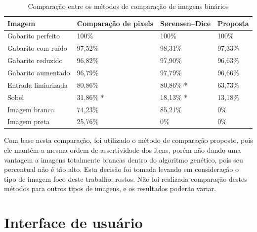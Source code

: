 \documentclass[12pt,oneside,a4paper,english,french,spanish,brazil,]{abntex2}
\begin{document}
\begin{table}
\centering
\caption{Comparação entre os métodos de comparação de imagens binários}
\label{tab:ComparacaoImagens}
\begin{tabular}{llll}
\hline
\textbf{Imagem} & \textbf{Comparação de pixels} & \textbf{Sørensen–Dice} & \textbf{Proposta} \\ \hline
Gabarito perfeito        & 100\%                                  & 100\%                           & 100\%                             \\
Gabarito com ruído       & 97,52\%                                & 98,31\%                         & 97,33\%                           \\
Gabarito reduzido        & 96,82\%                                & 97,90\%                         & 96,63\%                           \\
Gabarito aumentado       & 96,79\%                                & 97,79\%                         & 96,66\%                           \\
Entrada limiarizada      & 80,86\%                                & 80,86\% *                       & 63,73\%                            \\
Sobel                    & 31,86\% *                              & 18,13\% *                       & 13,18\%                          \\
Imagem branca            & 74,23\%                                & 85,21\%                         & 0\%                           \\
Imagem preta             & 25,76\%                                & 0\%                             & 0\% \\ \hline
\end{tabular}
\end{table}

Com base nesta comparação, foi utilizado o método de comparação proposto, pois ele mantém a mesma ordem de  assertividade dos itens, porém não dando uma vantagem a imagens totalmente brancas dentro do algoritmo genético, pois seu percentual não é tão alto. Esta decisão foi tomada levando em consideração o tipo de imagem foco deste trabalho: rostos. Não foi realizada comparação destes métodos para outros tipos de imagens, e os resultados poderão variar.

\section{Interface de usuário}
\end{document}
